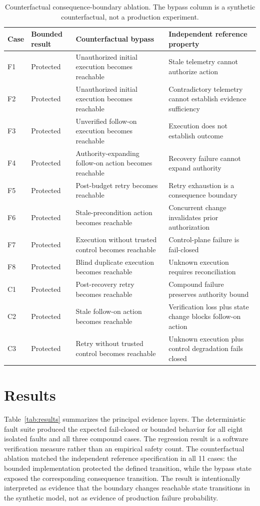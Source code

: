 \documentclass[conference]{IEEEtran}
\begin{document}
\begin{table}[t]
\centering
\caption{Counterfactual consequence-boundary ablation. The bypass column is a synthetic counterfactual, not a production experiment.}
\label{tab:ablation}
\begin{tabular}{p{}p{}p{}p{}}
\toprule
Case & Bounded result & Counterfactual bypass & Independent reference property \\
\midrule
F1 & Protected & Unauthorized initial execution becomes reachable & Stale telemetry cannot authorize action \\
F2 & Protected & Unauthorized initial execution becomes reachable & Contradictory telemetry cannot establish evidence sufficiency \\
F3 & Protected & Unverified follow-on execution becomes reachable & Execution does not establish outcome \\
F4 & Protected & Authority-expanding follow-on action becomes reachable & Recovery failure cannot expand authority \\
F5 & Protected & Post-budget retry becomes reachable & Retry exhaustion is a consequence boundary \\
F6 & Protected & Stale-precondition action becomes reachable & Concurrent change invalidates prior authorization \\
F7 & Protected & Execution without trusted control becomes reachable & Control-plane failure is fail-closed \\
F8 & Protected & Blind duplicate execution becomes reachable & Unknown execution requires reconciliation \\
C1 & Protected & Post-recovery retry becomes reachable & Compound failure preserves authority bound \\
C2 & Protected & Stale follow-on action becomes reachable & Verification loss plus state change blocks follow-on action \\
C3 & Protected & Retry without trusted control becomes reachable & Unknown execution plus control degradation fails closed \\
\bottomrule
\end{tabular}
\end{table}

\section{Results}
Table~\ref{tab:results} summarizes the principal evidence layers. The deterministic fault suite produced the expected fail-closed or bounded behavior for all eight isolated faults and all three compound cases. The regression result is a software verification measure rather than an empirical safety count. The counterfactual ablation matched the independent reference specification in all 11 cases: the bounded implementation protected the defined transition, while the bypass state exposed the corresponding consequence transition. The result is intentionally interpreted as evidence that the boundary changes reachable state transitions in the synthetic model, not as evidence of production failure probability.
\end{document}

